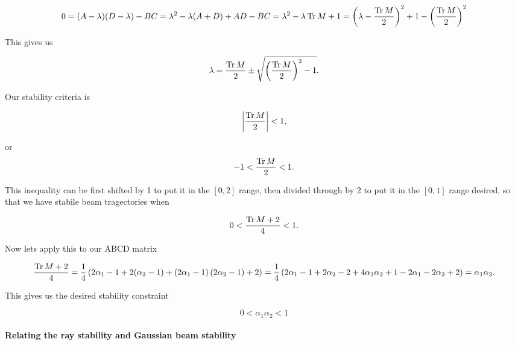 {\begin{dmath}\label{eqn:problemSet4Problem2:940}
0 
= (A - \lambda)(D - \lambda) - B C
= \lambda^2 - \lambda( A + D ) + A D - BC
= \lambda^2 - \lambda \tr M + 1
= \left(\lambda - \frac{\tr M}{2}\right)^2 + 1 - \left(\frac{\tr M}{2}\right)^2 
\end{dmath}

This gives us

\begin{dmath}\label{eqn:problemSet4Problem2:960}
\lambda = 
\frac{\tr M}{2} \pm \sqrt{ \left(\frac{\tr M}{2}\right)^2 - 1 }.
\end{dmath}

Our stability criteria is

\begin{dmath}\label{eqn:problemSet4Problem2:980}
\Abs{ \frac{\tr M}{2} } < 1,
\end{dmath}

or
\begin{equation}\label{eqn:problemSet4Problem2:1000}
-1 < \frac{\operatorname{Tr} M}{2} < 1.
\end{equation}

This inequality can be first shifted by 1 to put it in the $[0,2]$ range, then divided through by 2 to put it in the $[0, 1]$ range desired, so that we have stabile beam tragectories when

\begin{equation}\label{eqn:problemSet4Problem2:1020}
0 < \frac{\operatorname{Tr} M + 2 }{4} < 1.
\end{equation}

Now lets apply this to our ABCD matrix 

\begin{dmath}\label{eqn:problemSet4Problem2:1040}
\frac{\tr M + 2 }{4} 
=
\inv{4}
\left( 
2 \alpha_1 - 1 
+
2(\alpha_2 - 1) + 
\left(
2 \alpha_1 - 1
\right)
\left(
2 \alpha_2 - 1
\right)
+ 2 
\right)
=
\inv{4}
\left( 
2 \alpha_1 - 1 
+
2 \alpha_2 - 2 + 
4 \alpha_1 \alpha_2 + 1 - 2 \alpha_1 - 2 \alpha_2
+ 2 
\right)
=
\alpha_1 \alpha_2.
\end{dmath}

This gives us the desired stability constraint

\begin{equation}\label{eqn:problemSet4Problem2:1060}
\boxed{
0 < \alpha_1 \alpha_2 < 1
}
\end{equation}

\paragraph{Relating the ray stability and Gaussian beam stability}

}
